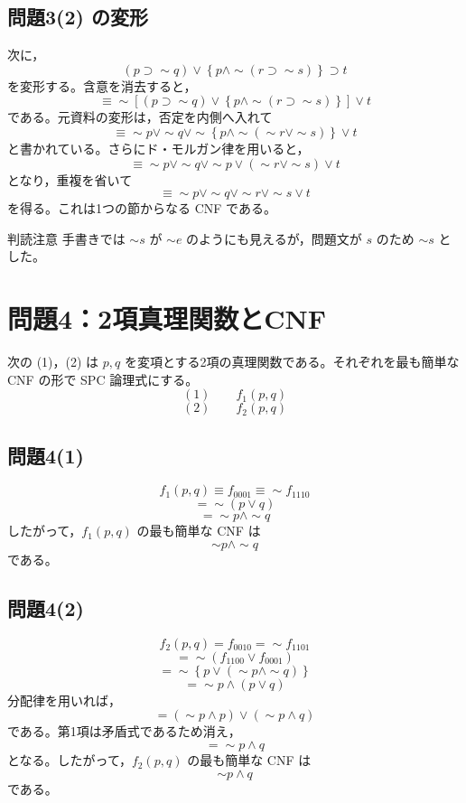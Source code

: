\documentclass[../main.tex]{subfiles}
\begin{document}
\subsection{問題3(2) の変形}

次に，
\[
  (p \supset \sim q)
  \lor
  \left\{
    p \land \sim(r \supset \sim s)
  \right\}
  \supset t
\]
を変形する。含意を消去すると，
\[
  \equiv
  \sim\left[
    (p \supset \sim q)
    \lor
    \left\{
      p \land \sim(r \supset \sim s)
    \right\}
  \right]
  \lor t
\]
である。元資料の変形は，否定を内側へ入れて
\[
  \equiv
  \sim p \lor \sim q
  \lor
  \sim
  \left\{
    p \land \sim(\sim r \lor \sim s)
  \right\}
  \lor t
\]
と書かれている。さらにド・モルガン律を用いると，
\[
  \equiv
  \sim p \lor \sim q
  \lor
  \sim p
  \lor
  (\sim r \lor \sim s)
  \lor t
\]
となり，重複を省いて
\[
  \equiv
  \sim p
  \lor
  \sim q
  \lor
  \sim r
  \lor
  \sim s
  \lor
  t
\]
を得る。これは1つの節からなる CNF である。

\begin{sidebox}[TBred]{判読注意}
  手書きでは \(\sim s\) が \(\sim e\) のようにも見えるが，問題文が \(s\) のため \(\sim s\) とした。
\end{sidebox}

\section{問題4：2項真理関数とCNF}

次の (1)，(2) は \(p,q\) を変項とする2項の真理関数である。それぞれを最も簡単な CNF の形で SPC 論理式にする。
\[
  (1)
  \qquad
  f_1(p,q)
\]
\[
  (2)
  \qquad
  f_2(p,q)
\]

\subsection{問題4(1)}

\[
  f_1(p,q)
  \equiv
  f_{0001}
  \equiv
  \sim f_{1110}
\]
\[
  =
  \sim(p \lor q)
\]
\[
  =
  \sim p \land \sim q
\]
したがって，\(f_1(p,q)\) の最も簡単な CNF は
\[
  \sim p \land \sim q
\]
である。

\subsection{問題4(2)}

\[
  f_2(p,q)
  =
  f_{0010}
  =
  \sim f_{1101}
\]
\[
  =
  \sim(f_{1100} \lor f_{0001})
\]
\[
  =
  \sim
  \left\{
    p \lor (\sim p \land \sim q)
  \right\}
\]
\[
  =
  \sim p
  \land
  (p \lor q)
\]
分配律を用いれば，
\[
  =
  (\sim p \land p)
  \lor
  (\sim p \land q)
\]
である。第1項は矛盾式であるため消え，
\[
  =
  \sim p \land q
\]
となる。したがって，\(f_2(p,q)\) の最も簡単な CNF は
\[
  \sim p \land q
\]
である。
\end{document}
